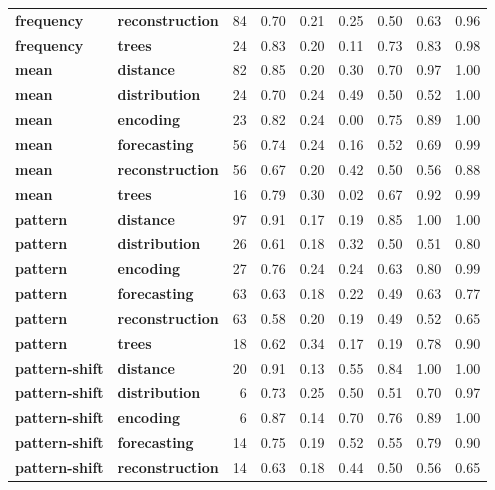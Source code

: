 \begin{table}
\begin{tabular}{llrrrrrrr}
\cline{1-9}
\textbf{frequency} & \textbf{reconstruction} & 84 & 0.70 & 0.21 & 0.25 & 0.50 & 0.63 & 0.96 \\
\cline{1-9}
\textbf{frequency} & \textbf{trees} & 24 & 0.83 & 0.20 & 0.11 & 0.73 & 0.83 & 0.98 \\
\cline{1-9}
\textbf{mean} & \textbf{distance} & 82 & 0.85 & 0.20 & 0.30 & 0.70 & 0.97 & 1.00 \\
\cline{1-9}
\textbf{mean} & \textbf{distribution} & 24 & 0.70 & 0.24 & 0.49 & 0.50 & 0.52 & 1.00 \\
\cline{1-9}
\textbf{mean} & \textbf{encoding} & 23 & 0.82 & 0.24 & 0.00 & 0.75 & 0.89 & 1.00 \\
\cline{1-9}
\textbf{mean} & \textbf{forecasting} & 56 & 0.74 & 0.24 & 0.16 & 0.52 & 0.69 & 0.99 \\
\cline{1-9}
\textbf{mean} & \textbf{reconstruction} & 56 & 0.67 & 0.20 & 0.42 & 0.50 & 0.56 & 0.88 \\
\cline{1-9}
\textbf{mean} & \textbf{trees} & 16 & 0.79 & 0.30 & 0.02 & 0.67 & 0.92 & 0.99 \\
\cline{1-9}
\textbf{pattern} & \textbf{distance} & 97 & 0.91 & 0.17 & 0.19 & 0.85 & 1.00 & 1.00 \\
\cline{1-9}
\textbf{pattern} & \textbf{distribution} & 26 & 0.61 & 0.18 & 0.32 & 0.50 & 0.51 & 0.80 \\
\cline{1-9}
\textbf{pattern} & \textbf{encoding} & 27 & 0.76 & 0.24 & 0.24 & 0.63 & 0.80 & 0.99 \\
\cline{1-9}
\textbf{pattern} & \textbf{forecasting} & 63 & 0.63 & 0.18 & 0.22 & 0.49 & 0.63 & 0.77 \\
\cline{1-9}
\textbf{pattern} & \textbf{reconstruction} & 63 & 0.58 & 0.20 & 0.19 & 0.49 & 0.52 & 0.65 \\
\cline{1-9}
\textbf{pattern} & \textbf{trees} & 18 & 0.62 & 0.34 & 0.17 & 0.19 & 0.78 & 0.90 \\
\cline{1-9}
\textbf{pattern-shift} & \textbf{distance} & 20 & 0.91 & 0.13 & 0.55 & 0.84 & 1.00 & 1.00 \\
\cline{1-9}
\textbf{pattern-shift} & \textbf{distribution} & 6 & 0.73 & 0.25 & 0.50 & 0.51 & 0.70 & 0.97 \\
\cline{1-9}
\textbf{pattern-shift} & \textbf{encoding} & 6 & 0.87 & 0.14 & 0.70 & 0.76 & 0.89 & 1.00 \\
\cline{1-9}
\textbf{pattern-shift} & \textbf{forecasting} & 14 & 0.75 & 0.19 & 0.52 & 0.55 & 0.79 & 0.90 \\
\cline{1-9}
\textbf{pattern-shift} & \textbf{reconstruction} & 14 & 0.63 & 0.18 & 0.44 & 0.50 & 0.56 & 0.65 \\

\end{tabular}
\end{table}
